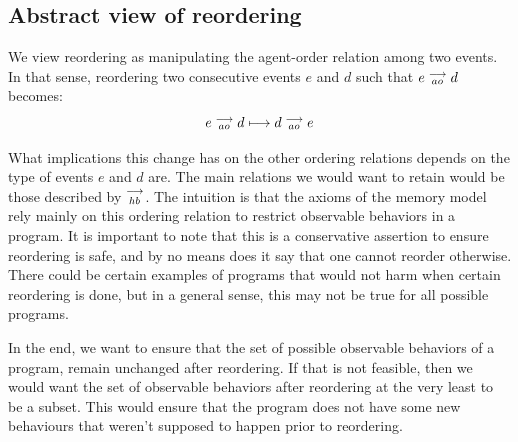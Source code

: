 
\subsection{Abstract view of reordering}
    
    We view reordering as manipulating the agent-order relation among two events. In that sense, reordering two consecutive events $e$ and $d$ such that $e \stackrel{\longrightarrow}{_{ao}} d$ becomes:
    \[
        e \stackrel{\longrightarrow}{_{ao}} d 
        \longmapsto
        d \stackrel{\longrightarrow}{_{ao}} e 
    \]
    
    What implications this change has on the other ordering relations depends on the type of events $e$ and $d$ are. The main relations we would want to retain would be those described by $\stackrel{\longrightarrow}{_{hb}}$. The intuition is that the axioms of the memory model rely mainly on this ordering relation to restrict observable behaviors in a program. It is important to note that this is a conservative assertion to ensure reordering is safe, and by no means does it say that one cannot reorder otherwise. There could be certain examples of programs that would not harm when certain reordering is done, but in a general sense, this may not be true for all possible programs. 
    
    In the end, we want to ensure that the set of possible observable behaviors of a program, remain unchanged after reordering. If that is not feasible, then we would want the set of observable behaviors after reordering at the very least to be a subset. This would ensure that the program does not have some new behaviours that weren't supposed to happen prior to reordering. 
    

